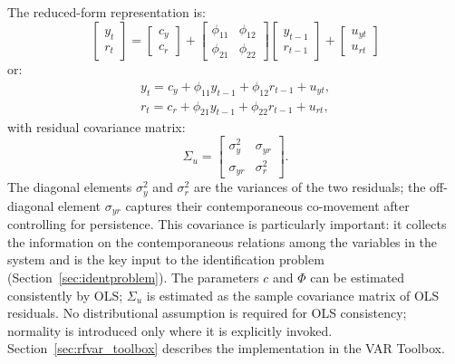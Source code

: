 \documentclass[12pt]{article}
\begin{document}
The reduced-form representation is:
\begin{equation}
	\left[
	\begin{array}{c}
		y_{t} \\
		r_{t}%
	\end{array}%
	\right] =%
	\begin{bmatrix}
		c_{y} \\
		c_{r} %
	\end{bmatrix}%
	+
	\begin{bmatrix}
		\phi _{11} & \phi _{12} \\
		\phi _{21} & \phi _{22}%
	\end{bmatrix}%
	\left[
	\begin{array}{c}
		y_{t-1} \\
		r_{t-1}%
	\end{array}%
	\right] +\left[
	\begin{array}{c}
		u_{yt} \\
		u_{rt}%
	\end{array}%
	\right]   \label{eq:red_var_1}
\end{equation}%
or:
\begin{equation}
	\begin{array}{c}
		y_{t}=c_y+ \phi _{11}y_{t-1}+\phi _{12}r_{t-1}+u_{yt}, \\
		r_{t}=c_r+ \phi _{21}y_{t-1}+\phi _{22}r_{t-1}+u_{rt},%
	\end{array}
	\label{eq:red_var_2}
\end{equation}
with residual covariance matrix:
\begin{equation}
	\Sigma_{u}=\left[
	\begin{array}{cc}
		\sigma _{y}^{2} & \sigma _{yr} \\
		\sigma _{yr} & \sigma _{r}^{2}%
	\end{array}%
	\right].  \label{eq:red_cov_1}
\end{equation}%
The diagonal elements $\sigma_y^2$ and $\sigma_r^2$ are the variances of the two residuals; the off-diagonal element $\sigma_{yr}$ captures their contemporaneous co-movement after controlling for persistence. This covariance is particularly important: it collects the information on the contemporaneous relations among the variables in the system and is the key input to the identification problem (Section~\ref{sec:identproblem}). The parameters $c$ and $\Phi$ can be estimated consistently by OLS; $\Sigma_u$ is estimated as the sample covariance matrix of OLS residuals. No distributional assumption is required for OLS consistency; normality is introduced only where it is explicitly invoked. Section~\ref{sec:rfvar_toolbox} describes the implementation in the VAR Toolbox.
\end{document}
